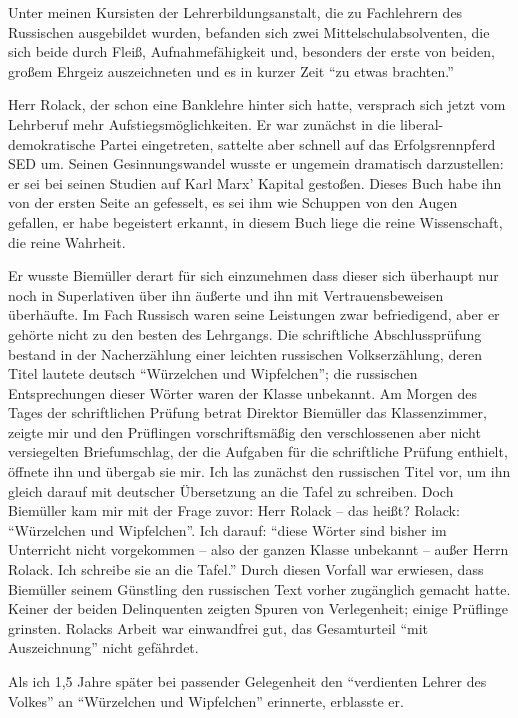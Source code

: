 \documentclass[a5paper,pagesize,10pt,twoside=true]{scrbook}
\renewcommand{\marginpar}[2][]{}
\begin{document}
Unter meinen Kursisten der Lehrerbildungsanstalt, die zu Fachlehrern des Russischen ausgebildet wurden, befanden sich zwei Mittelschulabsolventen, die sich beide durch Fleiß, Aufnahmefähigkeit und, besonders der erste von beiden, großem Ehrgeiz auszeichneten \marginpar{150} und es in kurzer Zeit \enquote{zu etwas brachten.}

Herr Rolack, der schon eine Banklehre hinter sich hatte, versprach sich jetzt vom Lehrberuf mehr Aufstiegsmöglichkeiten. Er war zunächst in die liberal-demokratische Partei eingetreten, sattelte aber schnell auf das Erfolgsrennpferd SED um. Seinen Gesinnungswandel wusste er ungemein dramatisch darzustellen: er sei bei seinen Studien auf Karl Marx' Kapital gestoßen. Dieses Buch habe ihn von der ersten Seite an gefesselt, es sei ihm wie Schuppen von den Augen gefallen, er habe begeistert erkannt, in diesem Buch liege die reine Wissenschaft, die reine Wahrheit.

Er wusste Biemüller derart für sich einzunehmen dass dieser sich überhaupt nur noch in Superlativen über ihn äußerte und ihn mit Vertrauensbeweisen überhäufte. Im Fach Russisch waren seine Leistungen zwar befriedigend, aber er gehörte nicht zu den besten des Lehrgangs. Die schriftliche Abschlussprüfung bestand in der Nacherzählung einer leichten russischen Volkserzählung, deren Titel lautete deutsch \enquote{Würzelchen und Wipfelchen}; die russischen Entsprechungen dieser Wörter waren der Klasse unbekannt. Am Morgen des Tages der schriftlichen Prüfung betrat Direktor Biemüller das Klassenzimmer, zeigte mir und den Prüflingen \marginpar{151} vorschriftsmäßig den verschlossenen aber nicht versiegelten Briefumschlag, der die Aufgaben für die schriftliche Prüfung enthielt, öffnete ihn und übergab sie mir. Ich las zunächst den russischen Titel vor, um ihn gleich darauf mit deutscher Übersetzung an die Tafel zu schreiben. Doch Biemüller kam mir mit der Frage zuvor: Herr Rolack -- das heißt? Rolack: \enquote{Würzelchen und Wipfelchen}. Ich darauf: \enquote{diese Wörter sind bisher im Unterricht nicht vorgekommen -- also der ganzen Klasse unbekannt -- außer Herrn Rolack. Ich schreibe sie an die Tafel.} Durch diesen Vorfall war erwiesen, dass Biemüller seinem Günstling den russischen Text vorher zugänglich gemacht hatte. Keiner der beiden Delinquenten zeigten Spuren von Verlegenheit; einige Prüflinge grinsten. Rolacks Arbeit war einwandfrei gut, das Gesamturteil \enquote{mit Auszeichnung} nicht gefährdet.

Als ich 1,5 Jahre später bei passender Gelegenheit den \enquote{verdienten Lehrer des Volkes} an \enquote{Würzelchen und Wipfelchen} erinnerte, erblasste er.
\end{document}
